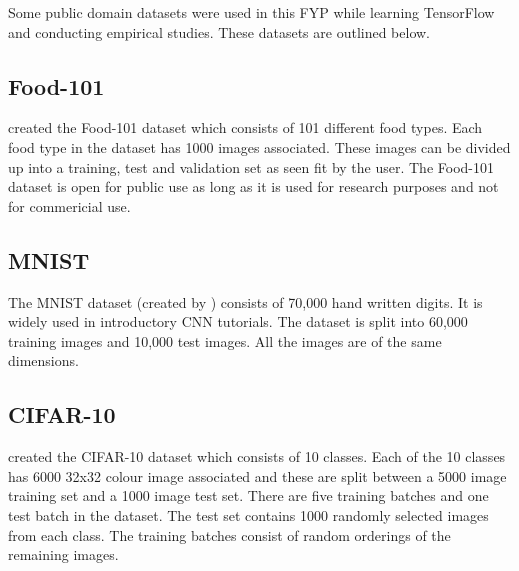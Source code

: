 Some public domain datasets were used in this FYP while learning TensorFlow and conducting empirical studies.
These datasets are outlined below.
\subsection*{Food-101}
\parencite{food101} created the Food-101 dataset which consists of 101 different food types.
Each food type in the dataset has 1000 images associated.
These images can be divided up into a training, test and validation set as seen fit by the user.
The Food-101 dataset is open for public use as long as it is used for research purposes and not for commericial use.

\subsection*{MNIST}
The MNIST dataset (created by \parencite{mnist}) consists of 70,000 hand written digits.
It is widely used in introductory CNN tutorials.
The dataset is split into 60,000 training images and 10,000 test images.
All the images are of the same dimensions.

\subsection*{CIFAR-10}
\parencite{cifar} created the CIFAR-10 dataset which consists of 10 classes.
Each of the 10 classes has 6000 32x32 colour image associated and these are split between a 5000 image training set and a 1000 image test set.
There are five training batches and one test batch in the dataset.
The test set contains 1000 randomly selected images from each class.
The training batches consist of random orderings of the remaining images.